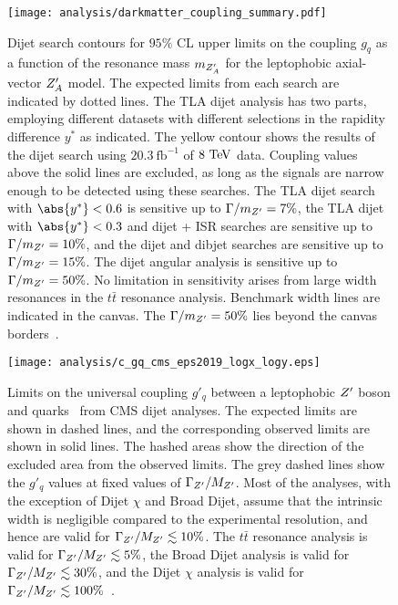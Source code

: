 \begin{figure}[htbp]
 \centering
 \texttt{[image: analysis/darkmatter\_coupling\_summary.pdf]}
 \caption[Dijet search contours for $95\%$ CL upper limits on the coupling $g_{q}$ for the leptophobic axial-vector $\Zprime_{A}$ model.]{%
 Dijet search contours for $95\%$ CL upper limits on the coupling $g_{q}$ as a function of the resonance mass $m_{Z^{\prime}_{A}}$ for the leptophobic axial-vector $\Zprime_{A}$ model.
 The expected limits from each search are indicated by dotted lines.
 The TLA dijet analysis has two parts, employing different datasets with different selections in the rapidity difference $y^{*}$ as indicated.
 The yellow contour shows the results of the dijet search using $20.3~\mathrm{fb}^{-1}$ of $8~\mathrm{TeV}$ data.
 Coupling values above the solid lines are excluded, as long as the signals are narrow enough to be detected using these searches.
 The TLA dijet search with $\abs{y^{*}} < 0.6$ is sensitive up to $\Gamma/m_{Z^{\prime}} = 7\%$, the TLA dijet with $\abs{y^{*}} < 0.3$ and dijet + ISR searches are sensitive up to $\Gamma/m_{Z^{\prime}} = 10\%$, and the dijet and dibjet searches are sensitive up to $\Gamma/m_{Z^{\prime}} = 15\%$.
 The dijet angular analysis is sensitive up to $\Gamma/m_{Z^{\prime}} = 50\%$.
 No limitation in sensitivity arises from large width resonances in the $t\bar{t}$ resonance analysis.
 Benchmark width lines are indicated in the canvas.
 The $\Gamma/m_{Z^{\prime}} = 50\%$ lies beyond the canvas borders~\cite{EXOT-2017-32}.}
 \label{fig:darkmatter_coupling_summary}
\end{figure}
\clearpage

\begin{figure}[htbp]
 \centering
 \texttt{[image: analysis/c\_gq\_cms\_eps2019\_logx\_logy.eps]}
 \caption[Limits on the universal coupling $g'_{q}$ between a leptophobic $\Zprime$ boson and quarks from CMS dijet analyses.]{%
 Limits on the universal coupling $g'_{q}$ between a leptophobic $\Zprime$ boson and quarks~\cite{CMS-EXO-16-032} from CMS dijet analyses.
 The expected limits are shown in dashed lines, and the corresponding observed limits are shown in solid lines.
 The hashed areas show the direction of the excluded area from the observed limits.
 The grey dashed lines show the $g'_{q}$ values at fixed values of $\Gamma_{Z^{\prime}}/M_{Z^{\prime}}$.
 Most of the analyses, with the exception of Dijet $\chi$ and Broad Dijet, assume that the intrinsic width is negligible compared to the experimental resolution, and hence are valid for $\Gamma_{Z^{\prime}}/M_{Z^{\prime}} \lesssim 10\%$.
 The $t\bar{t}$ resonance analysis is valid for $\Gamma_{Z^{\prime}}/M_{Z^{\prime}} \lesssim 5\%$, the Broad Dijet analysis is valid for $\Gamma_{Z^{\prime}}/M_{Z^{\prime}} \lesssim 30\%$, and the Dijet $\chi$ analysis is valid for $\Gamma_{Z^{\prime}}/M_{Z^{\prime}} \lesssim 100\%$~\cite{CMS:exotic-dijet-exclusions}.}
 \label{fig:CMS_dijet_summary}
\end{figure}

